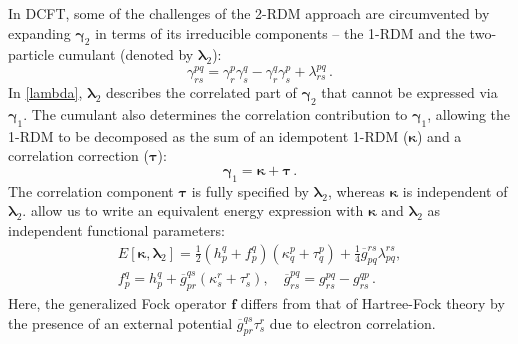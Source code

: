 In DCFT, some of the challenges of the 2-RDM approach are circumvented by
expanding $\boldsymbol{\gamma}_2$ in terms of its irreducible components -- the 1-RDM and
the two-particle cumulant (denoted by $\boldsymbol{\lambda}_2$):
\begin{equation}
	\label{lambda}
	\gamma_{rs}^{pq}
    =
	\gamma_r^p
    \gamma_s^q
    -
    \gamma_r^q
    \gamma_s^p
	+
    \lambda_{rs}^{pq}\,.
\end{equation}
In \cref{lambda}, $\boldsymbol{\lambda}_2$ describes the correlated part of $\boldsymbol{\gamma}_2$ that
cannot be expressed via $\boldsymbol{\gamma}_1$. The cumulant also determines the correlation
contribution to $\boldsymbol{\gamma}_1$, allowing the 1-RDM to be decomposed as the sum of an
idempotent 1-RDM ($\boldsymbol{\kappa}$) and a correlation correction ($\boldsymbol{\tau}$):
\begin{equation}
	\label{tau}
	\boldsymbol{\gamma}_1
    =
    \boldsymbol{\kappa}
    +
    \boldsymbol{\tau}\,.
\end{equation}
The correlation component $\boldsymbol{\tau}$ is fully specified by $\boldsymbol{\lambda}_2$, whereas
$\boldsymbol{\kappa}$ is independent of $\boldsymbol{\lambda}_2$.  allow us to write an
equivalent energy expression with $\boldsymbol{\kappa}$ and $\boldsymbol{\lambda}_2$ as independent
functional parameters:
\begin{equation}
	\label{e-dcft}
    \begin{array}{c}
        E[\boldsymbol{\kappa},\boldsymbol{\lambda}_2]
        =
        \tfrac{1}{2}
        (h_p^q+f_p^q)
        (\kappa_q^p+\tau_q^p)
        +
        \tfrac{1}{4}
        \overline{g}_{pq}^{rs}
        \lambda_{pq}^{rs}
        ,
        \\
        f_p^q
        =
        h_p^q
        +
        \overline{g}_{pr}^{qs}
        (\kappa_s^r+\tau_s^r)
        ,
        \quad
        \overline{g}_{rs}^{pq}
        =
        g_{rs}^{pq}
        -
        g_{rs}^{qp}\,.
    \end{array}
\end{equation}
Here, the generalized Fock operator $\boldsymbol{f}$ differs from that of
Hartree-Fock theory by the presence of an external potential
$\overline{g}_{pr}^{qs}\tau_s^r$ due to electron
correlation.\cite{Kutzelnigg:2006p171101}


